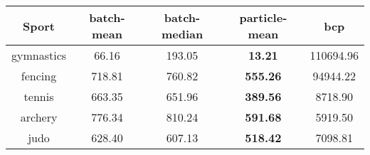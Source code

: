 \begin{tabular}{|c|c|c|c|c|}
\hline
Sport & batch-mean & batch-median & particle-mean & bcp \\
\hline
gymnastics & 66.16 & 193.05 & \textbf{13.21} & 110694.96 \\
fencing & 718.81 & 760.82 & \textbf{555.26} & 94944.22 \\
tennis & 663.35 & 651.96 & \textbf{389.56} & 8718.90 \\
archery & 776.34 & 810.24 & \textbf{591.68} & 5919.50 \\
judo & 628.40 & 607.13 & \textbf{518.42} & 7098.81 \\
\hline
\end{tabular}
